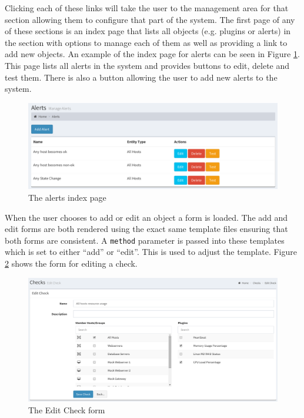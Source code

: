 \documentclass[bsc,deptreport,twoside,parskip,singlespacing,notimes]{infthesis}
\begin{document}
	Clicking each of these links will take the user to the management area for
	that section allowing them to configure that part of the system.  The first
	page of any of these sections is an index page that lists all objects (e.g.
	plugins or alerts) in the section with options to manage each of them as well
	as providing a link to add new objects.  An example of the index page for
	alerts can be seen in Figure \ref{alerts-index}.  This page lists all alerts
	in the system and provides buttons to edit, delete and test them. There is
	also a button allowing the user to add new alerts to the system.

\begin{figure}[H]
	\caption{The alerts index page}
	\label{alerts-index}
	\includegraphics[scale=0.55]{assets/screenshots/alerts-index.pdf}
\end{figure}


	When the user chooses to add or edit an object a form is loaded.  The add and
	edit forms are both rendered using the exact same template files ensuring that
	both forms are consistent.  A \texttt{method} parameter is passed into these
	templates which is set to either ``add'' or ``edit''.  This is used to adjust the
	template.  Figure \ref{edit-check} shows the form for editing a check.

\begin{figure}[H]
	\caption{The Edit Check form}
	\label{edit-check}
	\includegraphics[scale=0.45]{assets/screenshots/edit-check.pdf}
\end{figure}
\end{document}
